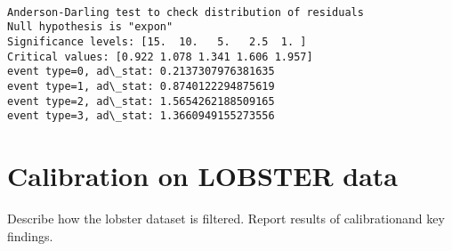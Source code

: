 \documentclass[10pt]{article}
\begin{document}
    \begin{center}
    \end{center}
    { \hspace*{\fill} \\}
    
    \begin{Verbatim}[commandchars=\\\{\}, fontsize=\small]
Anderson-Darling test to check distribution of residuals
Null hypothesis is "expon"
Significance levels: [15.  10.   5.   2.5  1. ]
Critical values: [0.922 1.078 1.341 1.606 1.957]
event type=0, ad\_stat: 0.2137307976381635
event type=1, ad\_stat: 0.8740122294875619
event type=2, ad\_stat: 1.5654262188509165
event type=3, ad\_stat: 1.3660949155273556
    \end{Verbatim}


\section{Calibration on LOBSTER data}
Describe how the lobster dataset is filtered. Report results of calibrationand key findings. 


    


    
\end{document}
